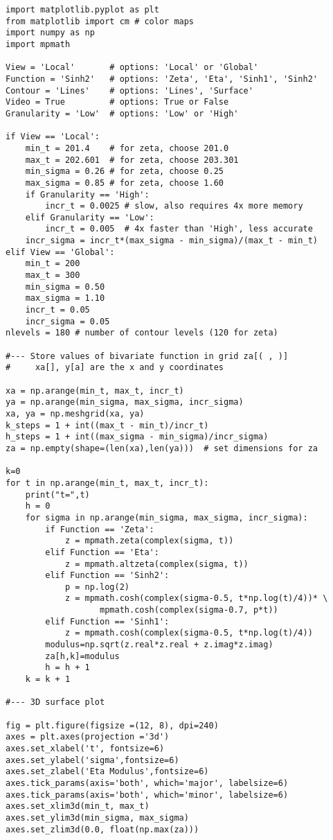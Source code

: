 \documentclass[oneside,10pt]{book}
\begin{document}
\begin{lstlisting}
import matplotlib.pyplot as plt
from matplotlib import cm # color maps
import numpy as np
import mpmath

View = 'Local'       # options: 'Local' or 'Global'
Function = 'Sinh2'   # options: 'Zeta', 'Eta', 'Sinh1', 'Sinh2'
Contour = 'Lines'    # options: 'Lines', 'Surface'
Video = True         # options: True or False
Granularity = 'Low'  # options: 'Low' or 'High'

if View == 'Local':
    min_t = 201.4    # for zeta, choose 201.0 
    max_t = 202.601  # for zeta, choose 203.301 
    min_sigma = 0.26 # for zeta, choose 0.25 
    max_sigma = 0.85 # for zeta, choose 1.60 
    if Granularity == 'High':
        incr_t = 0.0025 # slow, also requires 4x more memory
    elif Granularity == 'Low':
        incr_t = 0.005  # 4x faster than 'High', less accurate 
    incr_sigma = incr_t*(max_sigma - min_sigma)/(max_t - min_t)    
elif View == 'Global':
    min_t = 200
    max_t = 300
    min_sigma = 0.50
    max_sigma = 1.10
    incr_t = 0.05 
    incr_sigma = 0.05
nlevels = 180 # number of contour levels (120 for zeta)

#--- Store values of bivariate function in grid za[( , )]
#     xa[], y[a] are the x and y coordinates

xa = np.arange(min_t, max_t, incr_t)
ya = np.arange(min_sigma, max_sigma, incr_sigma)
xa, ya = np.meshgrid(xa, ya)
k_steps = 1 + int((max_t - min_t)/incr_t)
h_steps = 1 + int((max_sigma - min_sigma)/incr_sigma)
za = np.empty(shape=(len(xa),len(ya)))  # set dimensions for za

k=0
for t in np.arange(min_t, max_t, incr_t):
    print("t=",t) 
    h = 0
    for sigma in np.arange(min_sigma, max_sigma, incr_sigma):    
        if Function == 'Zeta':
            z = mpmath.zeta(complex(sigma, t)) 
        elif Function == 'Eta':
            z = mpmath.altzeta(complex(sigma, t))
        elif Function == 'Sinh2':
            p = np.log(2)
            z = mpmath.cosh(complex(sigma-0.5, t*np.log(t)/4))* \
                   mpmath.cosh(complex(sigma-0.7, p*t)) 
        elif Function == 'Sinh1':
            z = mpmath.cosh(complex(sigma-0.5, t*np.log(t)/4))
        modulus=np.sqrt(z.real*z.real + z.imag*z.imag)
        za[h,k]=modulus
        h = h + 1
    k = k + 1

#--- 3D surface plot 

fig = plt.figure(figsize =(12, 8), dpi=240)
axes = plt.axes(projection ='3d')
axes.set_xlabel('t', fontsize=6)
axes.set_ylabel('sigma',fontsize=6)
axes.set_zlabel('Eta Modulus',fontsize=6)
axes.tick_params(axis='both', which='major', labelsize=6)
axes.tick_params(axis='both', which='minor', labelsize=6)
axes.set_xlim3d(min_t, max_t)
axes.set_ylim3d(min_sigma, max_sigma)
axes.set_zlim3d(0.0, float(np.max(za)))


\end{lstlisting}
\end{document}
